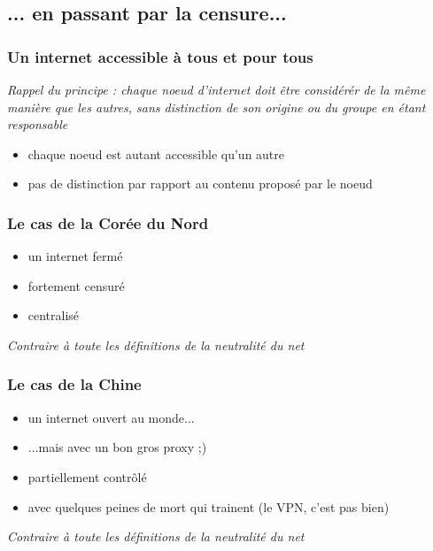 \subsection{... en passant par la censure...}
\begin{frame}\frametitle{Un internet accessible à tous et pour tous}
    \emph{Rappel du principe : chaque noeud d'internet doit être considérér de
        la même manière que les autres, sans distinction de son origine ou du
    groupe en étant responsable}

    \vspace{1em}

    \begin{itemize}
        \item chaque noeud est autant accessible qu'un autre
        \item pas de distinction par rapport au contenu proposé par le noeud
    \end{itemize}
\end{frame}


\begin{frame}\frametitle{Le cas de la Corée du Nord}
    \begin{itemize}
        \item un internet fermé
        \item fortement censuré
        \item centralisé
    \end{itemize}

    \vspace{1em}

    \color{red}\emph{Contraire à toute les définitions de la neutralité du net}
\end{frame}


\begin{frame}\frametitle{Le cas de la Chine}
    \begin{itemize}
        \item un internet ouvert au monde...
        \item ...mais avec un bon gros proxy ;)
        \item partiellement contrôlé
        \item avec quelques peines de mort qui trainent (le VPN, c'est pas bien)
    \end{itemize}

    \color{red}\emph{Contraire à toute les définitions de la neutralité du net}
\end{frame}


